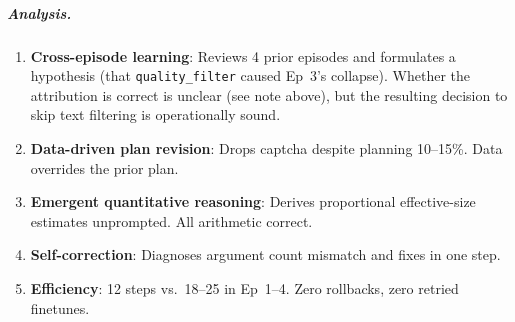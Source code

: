 \subparagraph{Analysis.}
\begin{enumerate}
    \item \textbf{Cross-episode learning}: Reviews 4 prior episodes and formulates a hypothesis (that \texttt{quality\_filter} caused Ep~3's collapse). Whether the attribution is correct is unclear (see note above), but the resulting decision to skip text filtering is operationally sound.
    \item \textbf{Data-driven plan revision}: Drops captcha despite planning 10--15\%. Data overrides the prior plan.
    \item \textbf{Emergent quantitative reasoning}: Derives proportional effective-size estimates unprompted. All arithmetic correct.
    \item \textbf{Self-correction}: Diagnoses argument count mismatch and fixes in one step.
    \item \textbf{Efficiency}: 12 steps vs.\ 18--25 in Ep~1--4. Zero rollbacks, zero retried finetunes.
\end{enumerate}



